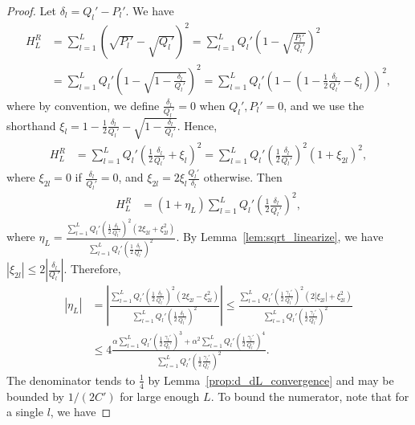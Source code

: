 \documentclass{article}
\begin{document}
\begin{proof}
Let $\delta_l = Q_l'-P_l'$. We have
\begin{align*}
H^R_L &= \sum_{l=1}^L (\sqrt{P_l'} - \sqrt{Q_l'})^2 = \sum_{l=1}^L Q_l' \left( 1 - \sqrt{\frac{P_l'}{Q_l'}} \right)^2 \\
 &= \sum_{l=1}^L Q_l' \left( 1 - \sqrt{1 - \frac{\delta_l}{Q_l'}} \right)^2 = \sum_{l=1}^L Q_l' \left( 1 - \left( 1 - \frac{1}{2} \frac{\delta_l}{Q_l'} - \xi_l \right) \right)^2, 
\end{align*}
where by convention, we define $\frac{\delta_l}{Q_l'} = 0$ when $Q_l', P_l' = 0$, and we use the shorthand $\xi_l = 1 - \frac{1}{2} \frac{\delta_l}{Q_l'} - \sqrt{ 1 - \frac{\delta_l}{Q_l'} }$. Hence,
\begin{align*}
H^R_L &=  \sum_{l=1}^L Q_l' \left(  \frac{1}{2} \frac{\delta_l}{Q_l'} + \xi_l \right)^2 =  \sum_{l=1}^L Q_l' \left(  \frac{1}{2} \frac{\delta_l}{Q_l'} \right)^2 \left( 1 + \xi_{2l} \right)^2, 
\end{align*}
where $\xi_{2l} = 0$ if $\frac{\delta_l}{Q_l'} = 0$, and $\xi_{2l} = 2 \xi_l \frac{Q_l'}{\delta_l}$ otherwise. Then
\begin{align*}
H^R_L &= (1 + \eta_L) \sum_{l=1}^L Q_l' \left( \frac{1}{2} \frac{\delta_l}{Q_l'} \right)^2,
\end{align*}
where $\eta_L = \frac{ \sum_{l=1}^L Q_l' \left( \frac{1}{2} \frac{\delta_l}{Q_l'} \right)^2 (2 \xi_{2l} + \xi_{2l}^2) }{ \sum_{l=1}^L Q_l' \left( \frac{1}{2} \frac{\delta_l}{Q_l'} \right)^2 }$. By Lemma~\ref{lem:sqrt_linearize}, we have $|\xi_{2l}| \leq 2 \left| \frac{\delta_l}{Q_l'} \right|$. Therefore,
\begin{align*}
|\eta_L| &= \left| \frac{ \sum_{l=1}^L Q_l' \left( \frac{1}{2} \frac{\delta_l}{Q_l'} \right)^2 (2 \xi_{2l} - \xi_{2l}^2) }
          { \sum_{l=1}^L Q_l' \left( \frac{1}{2} \frac{\delta_l}{Q_l'} \right)^2 } \right| \leq  \frac{ \sum_{l=1}^L Q_l' \left( \frac{1}{2} \frac{\gamma_l'}{Q_l'} \right)^2 (2 |\xi_{2l}| + \xi_{2l}^2) }
          { \sum_{l=1}^L Q_l' \left( \frac{1}{2} \frac{\gamma_l'}{Q_l'} \right)^2 } \\
  &\leq   4 \frac{ \alpha \sum_{l=1}^L Q_l' \left( \frac{1}{2} \frac{\gamma_l'}{Q_l'} \right)^3 +  
                   \alpha^2 \sum_{l=1}^L Q_l' \left( \frac{1}{2} \frac{\gamma_l'}{Q_l'} \right)^4 }
          { \sum_{l=1}^L Q_l' \left( \frac{1}{2} \frac{\gamma_l'}{Q_l'} \right)^2 }.
\end{align*}
The denominator tends to $\frac{1}{4}$ by Lemma~\ref{prop:d_dL_convergence} and may be bounded by $1/(2C')$ for large enough $L$. To bound the numerator, note that for a single $l$, we have

\end{proof}
\end{document}
